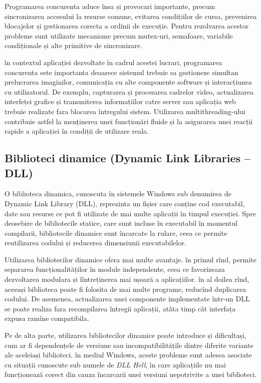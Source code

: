 Programarea concurenta aduce însa și provocari importante, precum sincronizarea accesului la resurse comune, evitarea condițiilor de cursa, prevenirea blocajelor și gestionarea corecta a ordinii de execuție. Pentru rezolvarea acestor probleme sunt utilizate mecanisme precum mutex-uri, semafoare, variabile condiționale și alte primitive de sincronizare.

în contextul aplicației dezvoltate în cadrul acestei lucrari, programarea concurenta este importanta deoarece sistemul trebuie sa gestioneze simultan prelucrarea imaginilor, comunicația cu alte componente software și interacțiunea cu utilizatorul. De exemplu, capturarea și procesarea cadrelor video, actualizarea interfeței grafice și transmiterea informațiilor catre server sau aplicația web trebuie realizate fara blocarea întregului sistem. Utilizarea multithreading-ului contribuie astfel la menținerea unei funcționări fluide și la asigurarea unei reacții rapide a aplicației în condiții de utilizare reala.

\subsection*{Biblioteci dinamice (Dynamic Link Libraries -- DLL)}

O biblioteca dinamica, cunoscuta în sistemele Windows sub denumirea de Dynamic Link Library (DLL), reprezinta un fișier care conține cod executabil, date sau resurse ce pot fi utilizate de mai multe aplicații în timpul execuției. Spre deosebire de bibliotecile statice, care sunt incluse în executabil în momentul compilarii, bibliotecile dinamice sunt încarcate la rulare, ceea ce permite reutilizarea codului și reducerea dimensiunii executabilelor.

Utilizarea bibliotecilor dinamice ofera mai multe avantaje. în primul rînd, permite separarea funcționalităților în module independente, ceea ce favorizeaza dezvoltarea modulara și îîntreținerea mai ușoară a aplicațiilor. în al doilea rînd, aceeași biblioteca poate fi folosita de mai multe programe, reducînd duplicarea codului. De asemenea, actualizarea unei componente implementate într-un DLL se poate realiza fara recompilarea întregii aplicații, atâta timp cât interfața expusa ramîne compatibila.

Pe de alta parte, utilizarea bibliotecilor dinamice poate introduce și dificultași, cum ar fi dependențele de versiune sau incompatibilitățile dintre diferite variante ale aceleiași biblioteci. în mediul Windows, aceste probleme sunt adesea asociate cu situații cunoscute sub numele de \textit{DLL Hell}, în care aplicațiile nu mai funcționează corect din cauza încarcarii unei versiuni nepotrivite a unei biblioteci.

